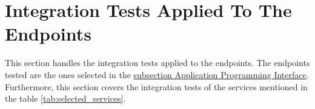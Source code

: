 \section{Integration Tests Applied To The Endpoints}

This section handles the integration tests applied to the endpoints. The endpoints tested are the ones selected in the \hyperref[subsection:apiContext]{subsection Application Programming Interface}. Furthermore, this section covers the integration tests of the services mentioned in the table \ref{tab:selected_services}.

